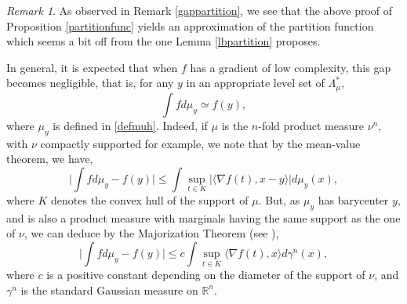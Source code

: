 \documentclass[aop,preprint]{imsart}
\newcommand\RR{\mathbb{R}}
\numberwithin{equation}{section}
\theoremstyle{definition}
\theoremstyle{plain}
\theoremstyle{remark}
\newtheorem{Rem}[Def]{Remark}
\begin{document}
\begin{Rem} \label{gap1} As observed in Remark \ref{gappartition}, we see that the above proof of Proposition \ref{partitionfunc} yields an approximation of the partition function which seems a bit off from the one Lemma \ref{lbpartition} proposes. 

  
In general, it is expected that when $f$ has a gradient of low complexity, this gap becomes negligible, that is, for any $y$ in an appropriate level set of $\Lambda^*_\mu$,
$$ \int f d\mu_y \simeq  f(y),$$
where $\mu_y$ is defined in \eqref{defmuh}.
 Indeed, if $\mu$ is the $n$-fold product measure $\nu^n$, with $\nu$ compactly supported for example, we note that by the mean-value theorem, we have,
$$ \big| \int f d\mu_y - f(y)\big| \leq \int \sup_{t \in K} |\langle \nabla f(t), x-y\rangle | d\mu_y(x),$$
where $K$ denotes the convex hull of the support of $\mu$. But, as $\mu_y$ has barycenter $y$, and is also a product measure with marginals having the same support as the one of $\nu$, we can deduce by the Majorization Theorem (see \cite[Theorem 12.16]{LT}),
$$ \big| \int f d\mu_y - f(y)\big|  \leq c\int \sup_{ t \in K} \langle \nabla f(t), x \rangle d\gamma^n(x),$$
where $c$ is a positive constant depending on the diameter of the support of $\nu$, and $\gamma^n$ is the standard Gaussian measure on $\RR^n$.
\end{Rem}
\end{document}
